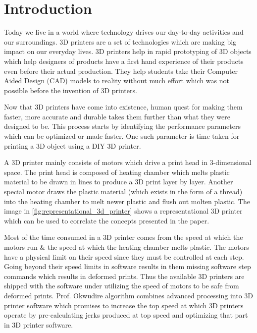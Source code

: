\documentclass[12pt,letterpaper]{article}
\begin{document}
\section{Introduction}
Today we live in a world where technology drives our day-to-day activities and our surroundings. 3D printers are a set of technologies which are making big impact on our everyday lives. 3D printers help in rapid prototyping of 3D objects which help designers of products have a first hand experience of their products even before their actual production. They help students take their Computer Aided Design (CAD) models to reality without much effort which was not possible before the invention of 3D printers.

Now that 3D printers have come into existence, human quest for making them faster, more accurate and durable takes them further than what they were designed to be. This process starts by identifying the performance parameters which can be optimized or made faster. One such parameter is time taken for printing a 3D object using a DIY 3D printer. 

A 3D printer mainly consists of motors which drive a print head in 3-dimensional space. The print head is composed of heating chamber which melts plastic material to be drawn in lines to produce a 3D print layer by layer. Another special motor draws the plastic material (which exists in the form of a thread) into the heating chamber to melt newer plastic and flush out molten plastic. The image in \ref{fig:representational_3d_printer} shows a representational 3D printer which can be used to correlate the concepts presented in the paper.

Most of the time consumed in a 3D printer comes from the speed at which the motors run & the speed at which the heating chamber melts plastic. The motors have a physical limit on their speed since they must be controlled at each step. Going beyond their speed limits in software results in them missing software step commands which results in deformed prints. Thus the available 3D printers are shipped with the software under utilizing the speed of motors to be safe from deformed prints. Prof. Okwudire algorithm combines advanced processing into 3D printer software which promises to increase the top speed at which 3D printers operate by pre-calculating jerks produced at top speed and optimizing that part in 3D printer software.
\end{document}
